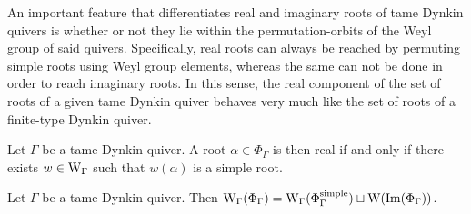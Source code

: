             An important feature that differentiates real and imaginary roots of tame Dynkin quivers is whether or not they lie within the permutation-orbits of the Weyl group of said quivers. Specifically, real roots can always be reached by permuting simple roots using Weyl group elements, whereas the same can not be done in order to reach imaginary roots. In this sense, the real component of the set of roots of a given tame Dynkin quiver behaves very much like the set of roots of a finite-type Dynkin quiver. 
            \begin{proposition} \label{prop: real_roots_as_reflections_of_simple_roots}
                Let $\Gamma$ be a tame Dynkin quiver. A root $\alpha \in \Phi_{\Gamma}$ is then real if and only if there exists $w \in \mathrm{W}_{\Gamma}$ such that $w(\alpha)$ is a simple root. 
            \end{proposition}
            \begin{corollary} \label{coro: real_and_imaginary_roots_of_tame_dynkin_quivers_have_disjoint_weyl_orbits}
                 Let $\Gamma$ be a tame Dynkin quiver. Then $\mathrm{W}_{\Gamma}(\Phi_{\Gamma}) = \mathrm{W}_{\Gamma}(\Phi^{\mathrm{simple}}_{\Gamma}) \sqcup \mathrm{W}(\operatorname{Im}(\Phi_{\Gamma}))$. 
            \end{corollary}